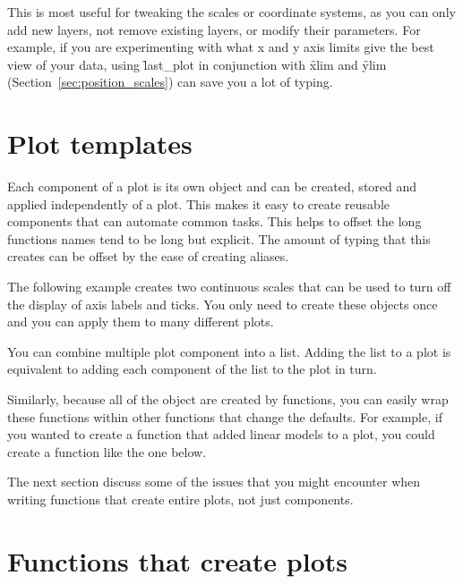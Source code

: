 This is most useful for tweaking the scales or coordinate systems, as you can only add new layers, not remove existing layers, or modify their parameters.  For example, if you are experimenting with what x and y axis limits give the best view of your data, using \f{last_plot} in conjunction with \f{xlim} and \f{ylim} (Section~\ref{sec:position_scales}) can save you a lot of typing.  

\section{Plot templates}
\label{sec:templates}

Each component of a \ggplot plot is its own object and can be created, stored and applied independently of a plot.  This makes it easy to create reusable components that can automate common tasks.  This helps to offset the long functions names tend to be long but explicit.  The amount of typing that this creates can be offset by the ease of creating aliases.

The following example creates two continuous scales that can be used to turn off the display of axis labels and ticks.  You only need to create these objects once and you can apply them to many different plots.

% 

You can combine multiple plot component into a list.  Adding the list to a plot is equivalent to adding each component of the list to the plot in turn.

Similarly, because all of the object are created by functions, you can easily wrap these functions within other functions that change the defaults.  For example, if you wanted to create a function that added linear models to a plot, you could create a function like the one below.

% 

The next section discuss some of the issues that you might encounter when writing functions that create entire plots, not just components.

\section{Functions that create plots}
\label{sec:functions}

